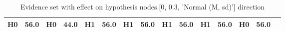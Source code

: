 \begin{table}
\begin{tabular}{c|cc|cc|cc|cc|cc|cc|cc}
\cellcolor{Bittersweet}H0&\cellcolor{Bittersweet}56.0&\cellcolor{Bittersweet}H0&\cellcolor{Bittersweet}44.0&\cellcolor{Bittersweet}H1&\cellcolor{Bittersweet}56.0&\cellcolor{Bittersweet}H1&\cellcolor{Bittersweet}56.0&\cellcolor{Bittersweet}H1&\cellcolor{Bittersweet}56.0&\cellcolor{Bittersweet}H1&\cellcolor{Bittersweet}56.0&\cellcolor{Bittersweet}H0&\cellcolor{Bittersweet}56.0\\\bottomrule\end{tabular}\caption{Evidence set with effect on hypothesis nodes.[0, 0.3, 'Normal (M, sd)'] direction}\end{table}